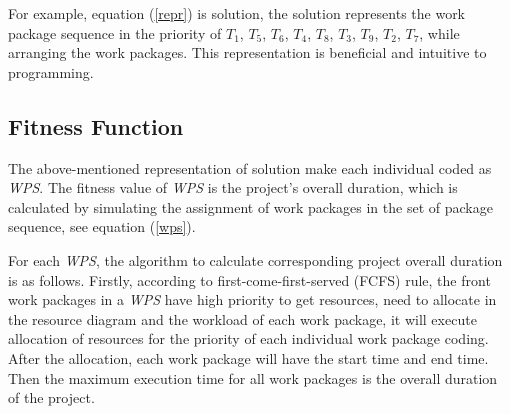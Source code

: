 For example, equation (\ref{repr}) is solution, the solution represents the work
package sequence in the priority of $T_1$, $T_5$, $T_6$, $T_4$, $T_8$, $T_3$,
$T_9$, $T_2$, $T_7$, while arranging the work packages. This representation is
beneficial and intuitive to programming.


\subsection{Fitness Function}
%
The above-mentioned representation of solution make each individual coded as
\emph{WPS}. The fitness value of \emph{WPS} is the project's overall duration,
which is calculated by simulating the assignment of work packages in the set of
package sequence, see equation (\ref{wps}).

For each \emph{WPS}, the algorithm to calculate corresponding project overall
duration is as follows. Firstly, according to first-come-first-served (FCFS)
rule, the front work packages in a \emph{WPS} have high priority to get
resources, need to allocate in the resource diagram and the workload of each
work package, it will execute allocation of resources for the priority of each
individual work package coding. After the allocation, each work package will
have the start time and end time. Then the maximum execution time for all work
packages is the overall duration of the project.

